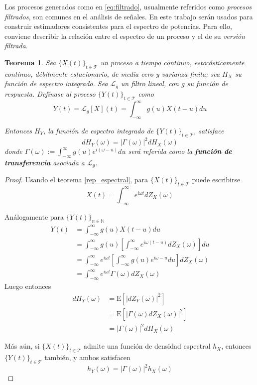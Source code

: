 \documentclass[12pt,letterpaper]{book}
\newtheorem{teorema}{Teorema}[chapter]
\newcommand{\intR}{\int_{-\infty}^{\infty}}
\newcommand{\E}[1]{\mathrm{E}\left[ #1 \right]}
\newcommand{\abso}[1]{\left| #1 \right|}
\newcommand{\xt}{$\{X(t)\}_{t\in \mathcal{T}}$ }
\begin{document}
Los procesos generados como en \ref{eq:filtrado}, usualmente referidos como \textit{procesos filtrados}, son comunes en el análisis de señales. 
%
En este trabajo serán usados para construir estimadores consistentes para el espectro de potencias.
%
Para ello, conviene describir la relación entre el espectro de un proceso y el de su \textit{versión filtrada}.

\begin{teorema}
Sea \xt un proceso a tiempo continuo, estocásticamente continuo, débilmente estacionario, de media cero y varianza finita; sea $H_X$ su función de espectro integrado.
%
Sea $\mathcal{L}_g$ un filtro lineal, con $g$ su función de respuesta.
%
Defínase al proceso $\{Y(t)\}_{t\in \mathcal{T}}$ como
\begin{equation}
Y(t) = \mathcal{L}_g[X](t) =  \intR g(u) X(t-u) du
\end{equation}

Entonces $H_Y$, la función de espectro integrado de $\{Y(t)\}_{t\in \mathcal{T}}$, satisface
\begin{equation}
dH_Y(\omega) = \abso{\Gamma(\omega)}^{2} dH_X(\omega)
\end{equation}
donde $\Gamma(\omega) := \intR g(u) e^{i (\omega -u) } du$ será referida como la \textbf{función de transferencia} asociada a $\mathcal{L}_g$. 
\label{lazy:rel_espectros}
\end{teorema}

\begin{proof}
Usando el teorema \ref{rep_espectral}, para \xt puede escribirse
\begin{equation}
X(t) = \intR e^{i \omega t }  dZ_X(\omega)
\end{equation}

Análogamente para $\{Y(t)\}_{n\in \mathbb{N}}$
\begin{align*}
Y(t) &= \intR g(u) X(t-u) du \\
&= \intR g(u) \left[ \intR e^{i \omega (t-u) }  dZ_X(\omega) \right] du \\
&= \intR e^{i \omega t } \left[ \intR g(u) e^{i \omega -u } du \right] dZ_X(\omega) \\
&= \intR e^{i \omega t } \Gamma(\omega) dZ_X(\omega)
\end{align*}
%
Luego entonces
\begin{align*}
dH_Y(\omega) &= \E{\abso{dZ_Y(\omega)}^{2}}  \\
&= \E{\abso{\Gamma(\omega) dZ_X(\omega)}^{2}}  \\
&= \abso{\Gamma(\omega)}^{2} dH_X(\omega)
\end{align*}

Más aún, si \xt admite una función de densidad espectral $h_X$, entonces $\{Y(t)\}_{t\in \mathcal{T}}$ también, y ambos satisfacen
%
\begin{equation}
h_Y(\omega) = \abso{\Gamma(\omega)}^{2} h_X(\omega)
\label{rel:espectros}
\end{equation}
\end{proof}
\end{document}
